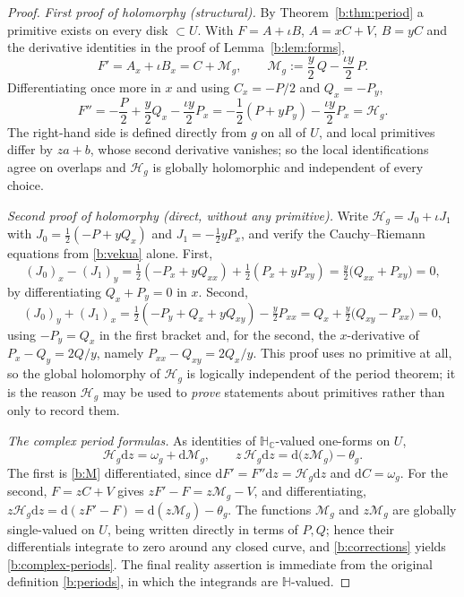 \documentclass[11pt,a4paper]{article}
\numberwithin{equation}{section}
\theoremstyle{definition}
\theoremstyle{remark}
\theoremstyle{plain}
\newcommand{\HH}{\mathbb H}
\newcommand{\HC}{\mathbb H_{\mathbb C}}
\newcommand{\om}{\omega}
\newcommand{\thet}{\theta}
\newcommand{\pot}{C}          %
\newcommand{\potV}{V}         %
\newcommand{\Hg}{\mathcal H_{g}}      %
\newcommand{\dd}{\mathrm d}
\begin{document}
\begin{proof}
\emph{First proof of holomorphy (structural).}  By
Theorem~\ref{b:thm:period} a primitive exists on every disk $\subset U$.
With $F=A+\iota B$, $A=x\pot+\potV$, $B=y\pot$ and the derivative identities
in the proof of Lemma~\ref{b:lem:forms},
\begin{equation}
 F'=A_x+\iota B_x=\pot+\mathcal M_g,
 \qquad
 \mathcal M_g:=\frac y2\,Q-\frac{\iota y}{2}\,P .
 \label{b:M}
\end{equation}
Differentiating once more in $x$ and using $\pot_x=-P/2$ and $Q_x=-P_y$,
\[
 F''=-\frac P2+\frac y2 Q_x-\frac{\iota y}{2}P_x
 =-\frac12(P+yP_y)-\frac{\iota y}{2}P_x=\Hg .
\]
The right-hand side is defined directly from $g$ on all of $U$, and local
primitives differ by $za+b$, whose second derivative vanishes; so the local
identifications agree on overlaps and $\Hg$ is globally holomorphic and
independent of every choice.

\emph{Second proof of holomorphy (direct, without any primitive).}  Write
$\Hg=J_0+\iota J_1$ with
$J_0=\tfrac12(-P+yQ_x)$ and $J_1=-\tfrac12 yP_x$, and verify the
Cauchy--Riemann equations from \eqref{b:vekua} alone.  First,
\[
 (J_0)_x-(J_1)_y
 =\tfrac12(-P_x+yQ_{xx})+\tfrac12(P_x+yP_{xy})
 =\tfrac y2\bigl(Q_{xx}+P_{xy}\bigr)=0,
\]
by differentiating $Q_x+P_y=0$ in $x$.  Second,
\[
 (J_0)_y+(J_1)_x
 =\tfrac12(-P_y+Q_x+yQ_{xy})-\tfrac y2P_{xx}
 =Q_x+\tfrac y2\bigl(Q_{xy}-P_{xx}\bigr)=0,
\]
using $-P_y=Q_x$ in the first bracket and, for the second, the $x$-derivative
of $P_x-Q_y=2Q/y$, namely $P_{xx}-Q_{xy}=2Q_x/y$.  This proof uses no
primitive at all, so the global holomorphy of $\Hg$ is logically independent
of the period theorem; it is the reason $\Hg$ may be used to \emph{prove}
statements about primitives rather than only to record them.

\emph{The complex period formulas.}  As identities of $\HC$-valued one-forms
on $U$,
\begin{equation}
 \Hg\dd z=\om_g+\dd\mathcal M_g,
 \qquad
 z\,\Hg\dd z=\dd\bigl(z\mathcal M_g\bigr)-\thet_g .
 \label{b:corrections}
\end{equation}
The first is \eqref{b:M} differentiated, since $\dd F'=F''\dd z=\Hg\dd z$ and
$\dd\pot=\om_g$.  For the second, $F=z\pot+\potV$ gives
$zF'-F=z\mathcal M_g-\potV$, and differentiating,
$z\Hg\dd z=\dd(zF'-F)=\dd(z\mathcal M_g)-\thet_g$.
The functions $\mathcal M_g$ and $z\mathcal M_g$ are globally single-valued
on $U$, being written directly in terms of $P,Q$; hence their differentials
integrate to zero around any closed curve, and \eqref{b:corrections} yields
\eqref{b:complex-periods}.  The final reality assertion is immediate from the
original definition \eqref{b:periods}, in which the integrands are
$\HH$-valued.
\end{proof}
\end{document}
